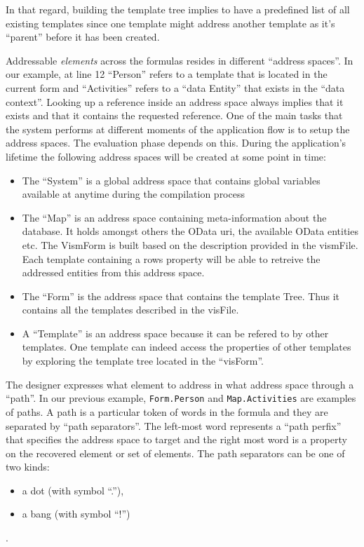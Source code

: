 In that regard, building the template tree implies to have a predefined list of all existing templates since one template might address another template as it's ``parent'' before it has been created.

Addressable \emph{elements} across the formulas resides in different ``address spaces''. In our example, at line 12 ``Person'' refers to a template that is located in the current form and ``Activities'' refers to a ``data Entity'' that exists in the ``data context''. Looking up a reference inside an address space always implies that it exists and that it contains the requested reference. One of the main tasks that the system performs at different moments of the application flow is to setup the address spaces. The evaluation phase depends on this. During the application's lifetime the following address spaces will be created at some point in time:
\begin{itemize}
    \item The ``System'' is a global address space that contains global variables available at anytime during the compilation process
    \item The ``Map'' is an address space containing meta-information about the database. It holds amongst others the OData uri, the available OData entities etc. The VismForm is built based on the description provided in the vismFile. Each template containing a rows property will be able to retreive the addressed entities from this address space.
    \item The ``Form'' is the address space that contains the template Tree. Thus it contains all the templates described in the visFile.
    \item A ``Template'' is an address space because it can be refered to by other templates. One template can indeed access the properties of other templates by exploring the template tree located in the ``visForm''.
\end{itemize}

The designer expresses what element to address in what address space through a ``path''. In our previous example, \texttt{Form.Person} and \texttt{Map.Activities} are examples of paths. A path is a particular token of words in the formula and they are separated by ``path separators''. The left-most word represents a ``path perfix'' that specifies the address space to target and the right most word is a property on the recovered element or set of elements. The path separators can be one of two kinds:
\begin{itemize}
    \item a dot (with symbol ``.''),
    \item a bang (with symbol ``!'')
\end{itemize}.

